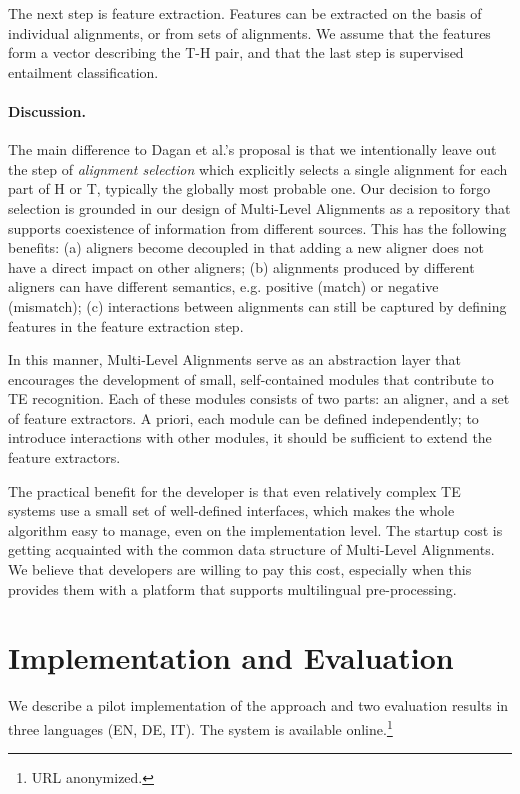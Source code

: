 \documentclass[11pt,letterpaper]{article}
\begin{document}
The next step is feature extraction. Features can be extracted on the
basis of individual alignments, or from sets of alignments. We assume
that the features form a vector describing the T-H pair, and that the
last step is supervised entailment classification.

\paragraph{Discussion.} The main difference to Dagan et al.'s proposal
is that we intentionally leave out the step of {\em alignment
  selection} which explicitly selects a single alignment for each part
of H or T, typically the globally most probable one. Our decision to
forgo selection is grounded in our design of Multi-Level Alignments as
a repository that supports coexistence of information from different
sources. This has the following benefits: (a) aligners become
decoupled in that adding a new aligner does not have a direct impact
on other aligners; 
(b) alignments produced by different aligners
can have different semantics, e.g. positive (match) or negative
(mismatch); (c) interactions between alignments can still be captured
by defining features in the feature extraction step.

In this manner, Multi-Level Alignments serve as an abstraction layer
that encourages the development of small, self-contained modules that
contribute to TE recognition. Each of these modules consists of two
parts: an aligner, and a set of feature extractors. A priori, each
module can be defined independently; to introduce interactions with
other modules, it should be sufficient to extend the feature
extractors.

The practical benefit for the developer is that even relatively
complex TE systems use a small set of well-defined interfaces, which
makes the whole algorithm easy to manage, even on the implementation
level. The startup cost is getting acquainted with the common data
structure of Multi-Level Alignments. We believe that developers are
willing to pay this cost, especially when this provides them with a
platform that supports multilingual pre-processing.

\section{Implementation and Evaluation}
\label{sec:impl}

We describe a pilot implementation of the approach and two evaluation
results in three languages (EN, DE, IT). The system is available
online.\footnote{{URL} anonymized.} 
\end{document}
